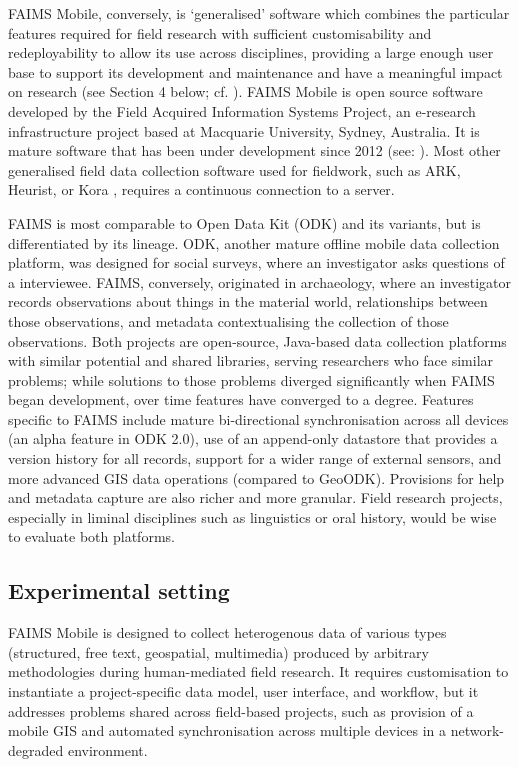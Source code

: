 \documentclass[preprint,12pt, a4paper]{elsarticle}
\begin{document}
FAIMS Mobile, conversely, is `generalised' software which combines the particular features required for field research with sufficient customisability and redeployability to allow its use across disciplines, providing a large enough user base to support its development and maintenance and have a meaningful impact on research (see Section 4 below; cf. \cite{Sobotkova2016-mx}). FAIMS Mobile is open source software developed by the Field Acquired Information Systems Project, an e-research infrastructure project based at Macquarie University, Sydney, Australia. It is mature software that has been under development since 2012 (see: \cite{Ross2015-mo, Ross2013-dz, Sobotkova2015-lq}). Most other generalised field data collection software used for fieldwork, such as ARK, Heurist, or Kora \cite{Gordon2016-xf}, requires a continuous connection to a server.

FAIMS is most comparable to Open Data Kit (ODK) and its variants, but is differentiated by its lineage. ODK, another mature offline mobile data collection platform, was designed for social surveys, where an investigator asks questions of a interviewee. FAIMS, conversely, originated in archaeology, where an investigator records observations about things in the material world, relationships between those observations, and metadata contextualising the collection of those observations. Both projects are open-source, Java-based data collection platforms with similar potential and shared libraries, serving researchers who face similar problems; while solutions to those problems diverged significantly when FAIMS began development, over time features have converged to a degree. Features specific to FAIMS include mature bi-directional synchronisation across all devices (an alpha feature in ODK 2.0), use of an append-only datastore that provides a version history for all records, support for a wider range of external sensors, and more advanced GIS data operations (compared to GeoODK). Provisions for help and metadata capture are also richer and more granular. Field research projects, especially in liminal disciplines such as linguistics or oral history, would be wise to evaluate both platforms. 


\subsection{Experimental setting}
\label{}

FAIMS Mobile is designed to collect heterogenous data of various types (structured, free text, geospatial, multimedia) produced by arbitrary methodologies during human-mediated field research. It requires customisation to instantiate a project-specific data model, user interface, and workflow, but it addresses problems shared across field-based projects, such as provision of a mobile GIS and automated synchronisation across multiple devices in a network-degraded environment.  
\end{document}
